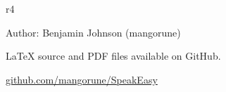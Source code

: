 \documentclass[10pt,letter]{article}
\begin{document}
\begin{backcover}
  \vfill

  \begin{wrapfigure}[4]{r}{4\baselineskip}
    \centering
    \vspace{-1.4\baselineskip}
    \href{https://goo.gl/B62dF0}{
    }
  \end{wrapfigure}
  Author: Benjamin Johnson (mangorune)

  \LaTeX{} source and PDF files %
  available on GitHub. %

  \hfill
  \href{https://github.com/mangorune/SpeakEasy/}{github.com/mangorune/SpeakEasy}

  \begin{center}
    \resizebox{\panelwidth}{!}{\ccZeroNotice}
  \end{center}
\end{backcover}


\begin{insideleft}





\end{insideleft}
\end{document}

